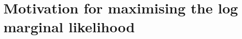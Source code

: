 \documentclass{article}
\begin{document}
\section{Motivation for maximising the log marginal likelihood}\label{appendix:why_lml}




\end{document}
